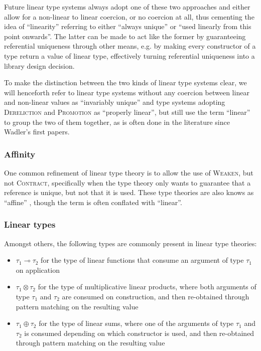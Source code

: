 Future linear type systems \citep{goos_observers_1992}\citep{atkey_syntax_2018}\citep{bernardy_linear_2018}\citep{brady_idris_2021}\citep{choudhury_graded_2021} \citep{li_linear_2022}\citep{spiwack_linearly_2022} always adopt one of these two approaches and either allow for a non-linear to linear coercion, or no coercion at all, thus cementing the idea of ``linearity'' referring to either ``always unique'' or ``used linearly from this point onwards''. The latter can be made to act like the former by guaranteeing referential uniqueness through other means, e.g. by making every constructor of a type return a value of linear type, effectively turning referential uniqueness into a library design decision.

To make the distinction between the two kinds of linear type systems clear, we will henceforth refer to linear type systems without any coercion between linear and non-linear values as ``invariably unique'' and type systems adopting \textsc{Dereliction} and \textsc{Promotion} as ``properly linear'', but still use the term ``linear'' to group the two of them together, as is often done in the literature since Wadler's first papers.

\subsubsection{Affinity}
One common refinement of linear type theory is to allow the use of \textsc{Weaken}, but not \textsc{Contract}, specifically when the type theory only wants to guarantee that a reference is unique, but not that it is used. These type theories are also knows as ``affine'' \citep{tov_practical_2011}, though the term is often conflated with ``linear''.

\subsubsection{Linear types}
Amongst others, the following types are commonly present in linear type theories:
\begin{itemize}
	\item $\tau_1 \multimap \tau_2$ for the type of linear functions that consume an argument of type $\tau_1$ on application
	\item $\tau_1 \otimes \tau_2$ for the type of multiplicative linear products, where both arguments of type $\tau_1$ and $\tau_2$ are consumed on construction, and then re-obtained through pattern matching on the resulting value
	\item $\tau_1 \oplus \tau_2$ for the type of linear sums, where one of the arguments of type $\tau_1$ and $\tau_2$ is consumed depending on which constructor is used, and then re-obtained through pattern matching on the resulting value
\end{itemize}

